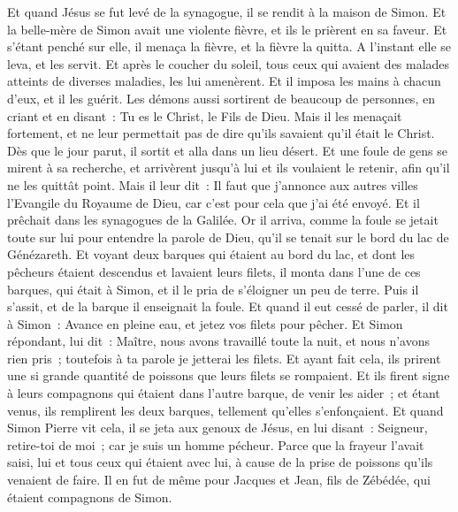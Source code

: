 \begin{multicols}{2}
Et quand Jésus se fut levé de la synagogue, il se rendit à la maison de Simon. Et la belle-mère de Simon avait une violente fièvre, et ils le prièrent en sa faveur.
Et s'étant penché sur elle, il menaça la fièvre, et la fièvre la quitta. A l'instant elle se leva, et les servit.
Et après le coucher du soleil, tous ceux qui avaient des malades atteints de diverses maladies, les lui amenèrent. Et il imposa les mains à chacun d'eux, et il les guérit.
Les démons aussi sortirent de beaucoup de personnes, en criant et en disant~: Tu es le Christ, le Fils de Dieu. Mais il les menaçait fortement, et ne leur permettait pas de dire qu'ils savaient qu'il était le Christ.
Dès que le jour parut, il sortit et alla dans un lieu désert. Et une foule de gens se mirent à sa recherche, et arrivèrent jusqu'à lui et ils voulaient le retenir, afin qu'il ne les quittât point.
Mais il leur dit~: Il faut que j'annonce aux autres villes l'Evangile du Royaume de Dieu, car c'est pour cela que j'ai été envoyé.
Et il prêchait dans les synagogues de la Galilée.
\VerseOne{}Or il arriva, comme la foule se jetait toute sur lui pour entendre la parole de Dieu, qu'il se tenait sur le bord du lac de Génézareth.
Et voyant deux barques qui étaient au bord du lac, et dont les pêcheurs étaient descendus et lavaient leurs filets, il monta dans l'une de ces barques, qui était à Simon,
et il le pria de s'éloigner un peu de terre. Puis il s'assit, et de la barque il enseignait la foule.
Et quand il eut cessé de parler, il dit à Simon~: Avance en pleine eau, et jetez vos filets pour pêcher.
Et Simon répondant, lui dit~: Maître, nous avons travaillé toute la nuit, et nous n'avons rien pris~; toutefois à ta parole je jetterai les filets.
Et ayant fait cela, ils prirent une si grande quantité de poissons que leurs filets se rompaient.
Et ils firent signe à leurs compagnons qui étaient dans l'autre barque, de venir les aider~; et étant venus, ils remplirent les deux barques, tellement qu'elles s'enfonçaient.
Et quand Simon Pierre vit cela, il se jeta aux genoux de Jésus, en lui disant~: Seigneur, retire-toi de moi~; car je suis un homme pécheur.
Parce que la frayeur l'avait saisi, lui et tous ceux qui étaient avec lui, à cause de la prise de poissons qu'ils venaient de faire. Il en fut de même pour Jacques et Jean, fils de Zébédée, qui étaient compagnons de Simon.

\end{multicols}
